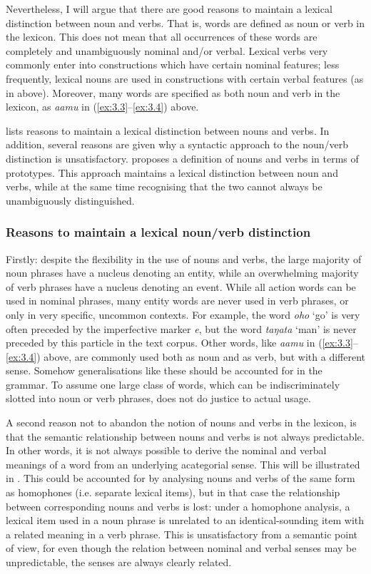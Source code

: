 Nevertheless, I will argue that there are good reasons to maintain a lexical distinction between noun and verbs. That is, words are defined as noun or verb in the lexicon. This does not mean that all occurrences of these words are completely and unambiguously nominal and/or verbal. Lexical verbs very commonly enter into constructions which have certain nominal features; less frequently, lexical nouns are used in constructions with certain verbal features (as in  above). Moreover, many words are specified as both noun and verb in the lexicon, as \textit{\mbox{{\ꞌ}a{\ꞌ}amu}} in (\ref{ex:3.3}–\ref{ex:3.4}) above.

 lists reasons to maintain a lexical distinction between nouns and verbs. In addition, several reasons are given why a syntactic approach to the noun/verb distinction is unsatisfactory.  proposes a definition of nouns and verbs in terms of prototypes. This approach maintains a lexical distinction between noun and verbs, while at the same time recognising that the two cannot always be unambiguously distinguished.

\subsubsection[Reasons to maintain a lexical noun/verb distinction]{Reasons to maintain a lexical noun/verb distinction}\label{sec:3.2.1.1}

Firstly: despite the flexibility in the use of nouns and verbs, the large majority of noun phrases have a nucleus denoting an entity, while an overwhelming majority of verb phrases have a nucleus denoting an event. While all action words can be used in nominal phrases, many entity words are never used in verb phrases, or only in very specific, uncommon contexts. For example, the word \textit{oho} ‘go’ is very often preceded by the imperfective marker \textit{e}, but the word \textit{taŋata} ‘man’ is never preceded by this particle in the text corpus. Other words, like \textit{\mbox{{\ꞌ}a{\ꞌ}amu}} in (\ref{ex:3.3}–\ref{ex:3.4}) above, are commonly used both as noun and as verb, but with a different sense. Somehow generalisations like these should be accounted for in the grammar. To assume one large class of words, which can be indiscriminately slotted into noun or verb phrases, does not do justice to actual usage.

A second reason not to abandon the notion of nouns and verbs in the lexicon, is that the semantic relationship between nouns and verbs is not always predictable. In other words, it is not always possible to derive the nominal and verbal meanings of a word from an underlying acategorial sense. This will be illustrated in . This could be accounted for by analysing nouns and verbs of the same form as homophones (i.e. separate lexical items), but in that case the relationship between corresponding nouns and verbs is lost: under a homophone analysis, a lexical item used in a noun phrase is unrelated to an identical-sounding item with a related meaning in a verb phrase. This is unsatisfactory from a semantic point of view, for even though the relation between nominal and verbal senses may be unpredictable, the senses are always clearly related. 

